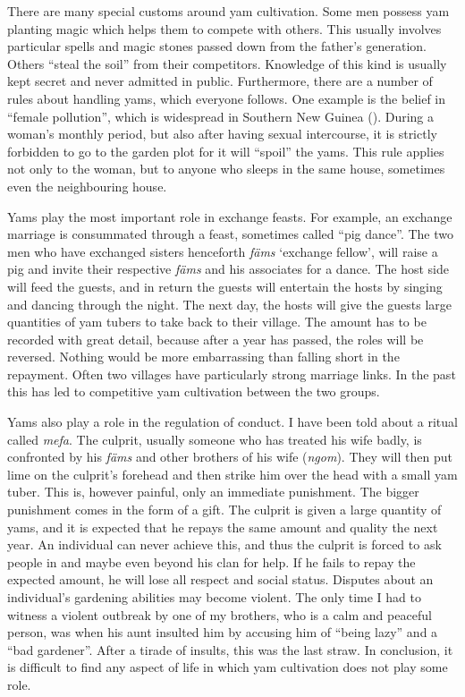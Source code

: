 There are many special customs around yam cultivation. Some men possess yam planting magic which helps them to compete with others. This usually involves particular spells and magic stones passed down from the father's generation. Others ``steal the soil'' from their competitors. Knowledge of this kind is usually kept secret and never admitted in public. Furthermore, there are a number of rules about handling yams, which everyone follows. One example is the belief in ``female pollution'', which is widespread in Southern New Guinea (\citealt[104]{Knauft:1993south}). During a woman's monthly period, but also after having sexual intercourse, it is strictly forbidden to go to the garden plot for it will ``spoil'' the yams. This rule applies not only to the woman, but to anyone who sleeps in the same house, sometimes even the neighbouring house.

Yams play the most important role in exchange feasts. For example, an exchange marriage is consummated through a feast, sometimes called ``pig dance''. The two men who have exchanged sisters henceforth \emph{fäms} `exchange fellow', will raise a pig and invite their respective \emph{fäms} and his associates for a dance. The host side will feed the guests, and in return the guests will entertain the hosts by singing and dancing through the night. The next day, the hosts will give the guests large quantities of yam tubers to take back to their village. The amount has to be recorded with great detail, because after a year has passed, the roles will be reversed. Nothing would be more embarrassing than falling short in the repayment. Often two villages have particularly strong marriage links. In the past this has led to competitive yam cultivation between the two groups.

Yams also play a role in the regulation of conduct. I have been told about a ritual called \emph{mefa}. The culprit, usually someone who has treated his wife badly, is confronted by his \emph{fäms} and other brothers of his wife (\emph{ngom}). They will then put lime on the culprit's forehead and then strike him over the head with a small yam tuber. This is, however painful, only an immediate punishment. The bigger punishment comes in the form of a gift. The culprit is given a large quantity of yams, and it is expected that he repays the same amount and quality the next year. An individual can never achieve this, and thus the culprit is forced to ask people in and maybe even beyond his clan for help. If he fails to repay the expected amount, he will lose all respect and social status. Disputes about an individual's gardening abilities may become violent. The only time I had to witness a violent outbreak by one of my brothers, who is a calm and peaceful person, was when his aunt insulted him by accusing him of ``being lazy'' and a ``bad gardener''. After a tirade of insults, this was the last straw. In conclusion, it is difficult to find any aspect of life in which yam cultivation does not play some role.

